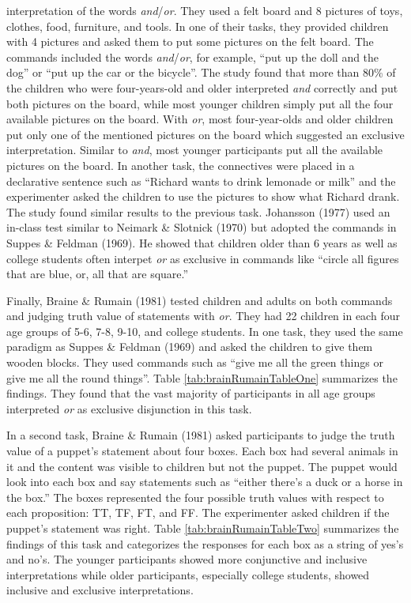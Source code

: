 \documentclass[oneside]{report}
\theoremstyle{definition}
\theoremstyle{definition}
\theoremstyle{definition}
\theoremstyle{remark}
\begin{document}
interpretation of the words \emph{and}/\emph{or}. They used a felt board
and 8 pictures of toys, clothes, food, furniture, and tools. In one of
their tasks, they provided children with 4 pictures and asked them to
put some pictures on the felt board. The commands included the words
\emph{and}/\emph{or}, for example, ``put up the doll and the dog'' or
``put up the car or the bicycle''. The study found that more than 80\%
of the children who were four-years-old and older interpreted \emph{and}
correctly and put both pictures on the board, while most younger
children simply put all the four available pictures on the board. With
\emph{or}, most four-year-olds and older children put only one of the
mentioned pictures on the board which suggested an exclusive
interpretation. Similar to \emph{and}, most younger participants put all
the available pictures on the board. In another task, the connectives
were placed in a declarative sentence such as ``Richard wants to drink
lemonade or milk'' and the experimenter asked the children to use the
pictures to show what Richard drank. The study found similar results to
the previous task. Johansson (1977) used an in-class test similar to
Neimark \& Slotnick (1970) but adopted the commands in Suppes \& Feldman
(1969). He showed that children older than 6 years as well as college
students often interpet \emph{or} as exclusive in commands like ``circle
all figures that are blue, or, all that are square.''

Finally, Braine \& Rumain (1981) tested children and adults on both
commands and judging truth value of statements with \emph{or}. They had
22 children in each four age groups of 5-6, 7-8, 9-10, and college
students. In one task, they used the same paradigm as Suppes \& Feldman
(1969) and asked the children to give them wooden blocks. They used
commands such as ``give me all the green things or give me all the round
things''. Table \ref{tab:brainRumainTableOne} summarizes the findings.
They found that the vast majority of participants in all age groups
interpreted \emph{or} as exclusive disjunction in this task.

In a second task, Braine \& Rumain (1981) asked participants to judge
the truth value of a puppet's statement about four boxes. Each box had
several animals in it and the content was visible to children but not
the puppet. The puppet would look into each box and say statements such
as ``either there's a duck or a horse in the box.'' The boxes
represented the four possible truth values with respect to each
proposition: TT, TF, FT, and FF. The experimenter asked children if the
puppet's statement was right. Table \ref{tab:brainRumainTableTwo}
summarizes the findings of this task and categorizes the responses for
each box as a string of yes's and no's. The younger participants showed
more conjunctive and inclusive interpretations while older participants,
especially college students, showed inclusive and exclusive
interpretations.
\end{document}
